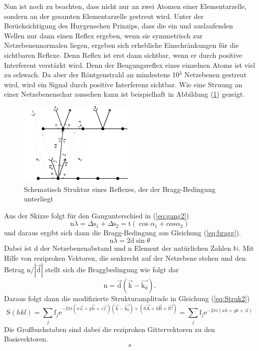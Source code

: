 Nun ist noch zu beachten, dass nicht nur an zwei Atomen einer Elementarzelle, sondern an der gesamten Elementarzelle gestreut wird. 
Unter der Berücksichtigung des Huygenschen Prinzips, dass die ein und auslaufenden Wellen nur dann einen Reflex ergeben, wenn sie symmetrisch zur Netzebenennormalen liegen, ergeben sich erhebliche Einschränkungen für die sichtbaren Reflexe.
Denn Reflex ist erst dann sichtbar, wenn er durch positive Interferent verstärkt wird. Denn der Beugungsreflex eines einzelnen Atoms ist viel zu schwach.
Da aber der Röntgenstrahl an mindestens 10$^3$ Netzebenen gestreut wird, wird ein Signal durch positive Interferenz sichtbar.
Wie eine Struung an einer Netzebenenschar aussehen kann ist beispielhaft in Abbildung (\ref{fig:bragg}) gezeigt.
\begin{figure}[h]
	\centering
	\includegraphics[width = 0.5\textwidth]{Abbildungen/bragg}
	\caption{Schematisch Struktur eines Reflexes, der der Bragg-Bedingung unterliegt}
	\label{fig:bragg}
\end{figure}
Aus der Skizze folgt für den Gangunterschied in (\ref{eq:gang2}) 
\begin{equation}
\text{n} \lambda = \Delta \text{s}_1+\Delta \text{s}_2 = \text{t}(\cos{\alpha_1}+cos{\alpha_2})
\label{eq:gang2}
\end{equation}
und daraus ergibt sich dann die Bragg-Bedingung aus Gleichung (\ref{eq:bragg}).
\begin{equation}
\text{n}\lambda = 2 \text{d} \sin{\theta}
\label{eq:bragg}
\end{equation}
Dabei ist d der Netzebenenabstand und n Element der natürlichen Zahlen $\mathbb{N}$.
Mit Hilfe von reziproken Vektoren, die senkrecht auf der Netzebene stehen und den Betrag n/$|\vec{\text{d}}|$ stellt sich die Braggbedingung wie folgt dar
\begin{equation}
 \text{n} = \vec{ \text{d}}(\vec{ \text{k}}-\vec{ \text{k}_0}).
\end{equation}
Daraus folgt dann die modifizierte Strukturamplitude in Gleichung (\ref{eq:Struk2})
\begin{equation}
\text{S}(hkl) = \sum_j \text{f}_j \text{e}^{-2\pi i (x\vec{\text{a}}+y \vec{\text{b}}+ z \vec{\text{c}}) (\vec{\text{k}}-\vec{\text{k}_0})\times (h\vec{\text{A}}+k\vec{\text{B}}+ l\vec{\text{C}}) } = \sum_j \text{f}_j \text{e}^{-2\pi i (xh+y k+ z l) }
\label{eq:Struk2}
\end{equation}
Die Großbuchstaben sind dabei die reziproken Gittervektoren zu den Basisvektoren.
\begin{equation}
s
\label{eq:g}
\end{equation}